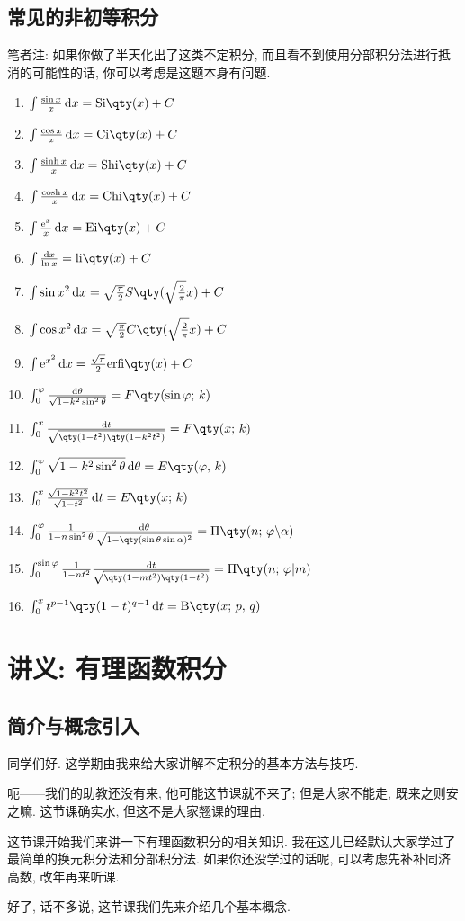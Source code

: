 \documentclass{ctexbook}
\newcommand{\e}{\mathrm{e}}
\newcommand*{\dif}{\mathop{}\!\mathrm{d}}
\begin{document}
{\section{常见的非初等积分}
笔者注: 如果你做了半天化出了这类不定积分, 而且看不到使用分部积分法进行抵消的可能性的话, 你可以考虑是这题本身有问题. 
\begin{enumerate}
\item$\int\frac{\sin{x}}{x}\dif{x}=\mathrm{Si}\qty(x)+C$
\item$\int\frac{\cos{x}}{x}\dif{x}=\mathrm{Ci}\qty(x)+C$
\item$\int\frac{\sinh{x}}{x}\dif{x}=\mathrm{Shi}\qty(x)+C$
\item$\int\frac{\cosh{x}}{x}\dif{x}=\mathrm{Chi}\qty(x)+C$
\item$\int\frac{\e^{x}}{x}\dif{x}=\mathrm{Ei}\qty(x)+C$
\item$\int\frac{\dif{x}}{\ln{x}}=\mathrm{li}\qty(x)+C$
\item$\int\sin{x^{2}}\dif{x}=\sqrt{\frac{\pi}{2}}S\qty(\sqrt{\frac{2}{\pi}}x)+C$
\item$\int\cos{x^{2}}\dif{x}=\sqrt{\frac{\pi}{2}}C\qty(\sqrt{\frac{2}{\pi}}x)+C$
\item$\int\e^{x^{2}}\dif{x}=\frac{\sqrt{\pi}}{2}\mathrm{erfi}\qty(x)+C$
\item$\int_{0}^{\varphi}\frac{\dif{\theta}}{\sqrt{1-k^{2}\sin^{2}{\theta}}}=F\qty(\sin{\varphi};\,k)$
\item$\int_{0}^{x}\frac{\dif{t}}{\sqrt{\qty(1-t^{2})\qty(1-k^{2}t^{2})}}=F\qty(x;\,k)$
\item$\int_{0}^{\varphi}\sqrt{1-k^{2}\sin^{2}{\theta}}\dif{\theta}=E\qty(\varphi,\,k)$
\item$\int_{0}^{x}\frac{\sqrt{1-k^{2}t^{2}}}{\sqrt{1-t^{2}}}\dif{t}=E\qty(x;\,k)$
\item$\int_{0}^{\varphi}\frac{1}{1-n\sin^{2}{\theta}}\frac{\dif{\theta}}{\sqrt{1-\qty(\sin{\theta}\sin{\alpha})^{2}}}=\Pi\qty(n;\,\varphi\backslash\alpha)$
\item$\int_{0}^{\sin{\varphi}}\frac{1}{1-nt^{2}}\frac{\dif{t}}{\sqrt{\qty(1-mt^{2})\qty(1-t^{2})}}=\Pi\qty(n;\,\varphi|m)$
\item$\int_{0}^{x}t^{p-1}\qty(1-t)^{q-1}\dif{t}=\mathrm{B}\qty(x;\,p,\,q)$
\end{enumerate}
\par
\chapter{讲义: 有理函数积分}
\section{简介与概念引入}
同学们好. 这学期由我来给大家讲解不定积分的基本方法与技巧. \par
呃——我们的助教还没有来, 他可能这节课就不来了; 但是大家不能走, 既来之则安之嘛. 这节课确实水, 但这不是大家翘课的理由. \par
这节课开始我们来讲一下有理函数积分的相关知识. 我在这儿已经默认大家学过了最简单的换元积分法和分部积分法. 如果你还没学过的话呢, 可以考虑先补补同济高数, 改年再来听课. \par
好了, 话不多说, 这节课我们先来介绍几个基本概念. \par
}
\end{document}
